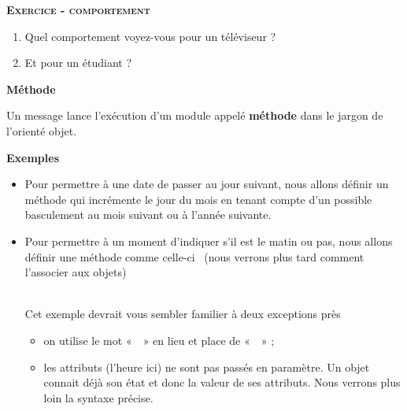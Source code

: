 {\sffamily\bfseries\scshape
Exercice - comportement}

\begin{enumerate}
	\item {
		Quel comportement voyez-vous pour un téléviseur ?}
	\item {
		Et pour un étudiant ?}
\end{enumerate}

\bigskip

{\sffamily\bfseries\upshape
Méthode}

{Un message lance l'exécution d'un
module appelé \textbf{méthode} dans le jargon de
l'orienté objet. }

{\bfseries
Exemples}

\liststyleListv
\begin{itemize}
	\item {
		Pour permettre à une date de passer au jour suivant, nous allons définir
		un méthode qui incrémente le jour du mois en tenant compte
		d'un possible basculement au mois suivant ou à
		l'année suivante.}
	\item {
		Pour permettre à un moment d'indiquer
		s'il est le matin ou pas, nous allons définir une
		méthode comme celle-ci \ (nous verrons plus tard comment
		l'associer aux objets)}

		\bigskip

		\\
		\bigskip
		{
		Cet exemple devrait vous sembler familier à deux exceptions près}

		\liststyleListv
		\begin{itemize}
			\item {
				on utilise le mot «~~» en lieu et place de
				«~~» ;}
			\item {
				les attributs (l'heure ici) ne sont pas passés en
				paramètre. Un objet connait déjà son état et donc la valeur de ses
				attributs. Nous verrons plus loin la syntaxe précise.}
	\end{itemize}
\end{itemize}

